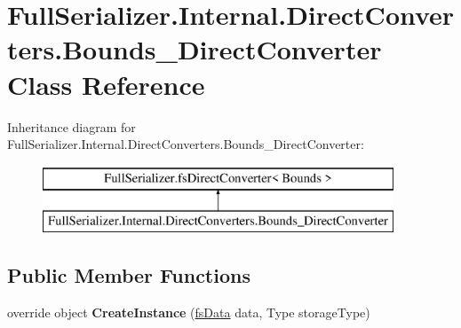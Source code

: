 \hypertarget{class_full_serializer_1_1_internal_1_1_direct_converters_1_1_bounds___direct_converter}{}\section{Full\+Serializer.\+Internal.\+Direct\+Converters.\+Bounds\+\_\+\+Direct\+Converter Class Reference}
\label{class_full_serializer_1_1_internal_1_1_direct_converters_1_1_bounds___direct_converter}
Inheritance diagram for Full\+Serializer.\+Internal.\+Direct\+Converters.\+Bounds\+\_\+\+Direct\+Converter\+:\begin{figure}[H]
\begin{center}
\leavevmode
\includegraphics[height=2.000000cm]{class_full_serializer_1_1_internal_1_1_direct_converters_1_1_bounds___direct_converter}
\end{center}
\end{figure}
\subsection*{Public Member Functions}
\begin{DoxyCompactItemize}
\item 
\mbox{\label{class_full_serializer_1_1_internal_1_1_direct_converters_1_1_bounds___direct_converter_a51f328e67770f34468f7218b4a4a2af6}} 
override object {\bfseries Create\+Instance} (\hyperlink{class_full_serializer_1_1fs_data}{fs\+Data} data, Type storage\+Type)
\end{DoxyCompactItemize}
